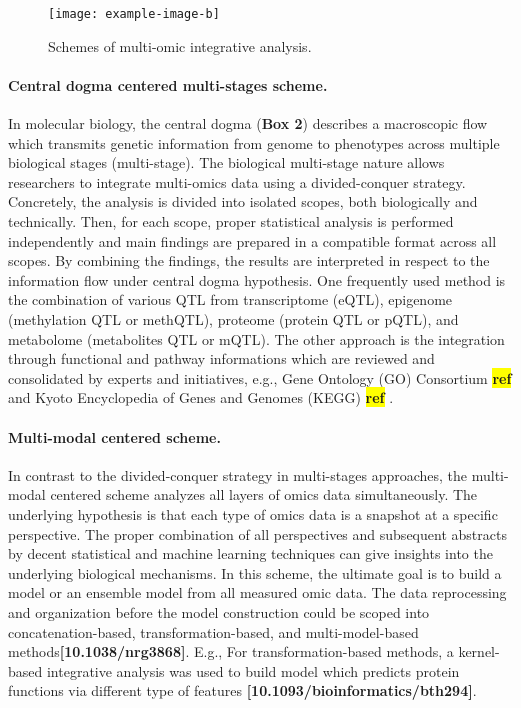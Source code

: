 \documentclass[12pt,usletter,fancy]{elegantbook}
\newcommand{\reqref}[1][ref]{
  \colorbox{yellow}{\textbf{#1}}
}
\begin{document}
\begin{figure}[h]
  \centering
  \texttt{[image: example-image-b]}
  \vspace*{0.2cm}
  \caption{Schemes of multi-omic integrative analysis.}
  \label{fig:example-image-b}
\end{figure}

\paragraph*{Central dogma centered multi-stages scheme.}
In molecular biology, the central dogma (\textbf{Box 2}) describes a macroscopic flow which transmits genetic information from genome to phenotypes across multiple biological stages (multi-stage).
The biological multi-stage nature allows researchers to integrate multi-omics data using a divided-conquer strategy.
Concretely, the analysis is divided into isolated scopes, both biologically and technically.
Then, for each scope, proper statistical analysis is performed independently and main findings are prepared in a compatible format across all scopes.
By combining the findings, the results are interpreted in respect to the information flow under central dogma hypothesis.
One frequently used method is the combination of various QTL from transcriptome (eQTL), epigenome (methylation QTL or methQTL), proteome (protein QTL or pQTL), and metabolome (metabolites QTL or mQTL).
The other approach is the integration through functional and pathway informations which are reviewed and consolidated by experts and initiatives, e.g., Gene Ontology (GO) Consortium\reqref and Kyoto Encyclopedia of Genes and Genomes (KEGG)\reqref.

\paragraph*{Multi-modal centered scheme.}
In contrast to the divided-conquer strategy in multi-stages approaches, the multi-modal centered scheme analyzes all layers of omics data simultaneously.
The underlying hypothesis is that each type of omics data is a snapshot at a specific perspective.
The proper combination of all perspectives and subsequent abstracts by decent statistical and machine learning techniques can give insights into the underlying biological mechanisms.
In this scheme, the ultimate goal is to build a model or an ensemble model from all measured omic data.
The data reprocessing and organization before the model construction could be scoped into concatenation-based, transformation-based, and multi-model-based methods\textbf{[10.1038/nrg3868]}.
E.g., For transformation-based methods, a kernel-based integrative analysis was used to build model which predicts protein functions via different type of features \textbf{[10.1093/bioinformatics/bth294]}.
\end{document}
